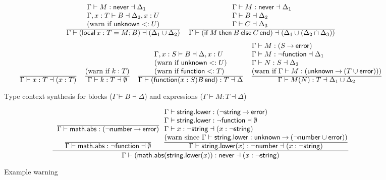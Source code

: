 \documentclass[sigplan]{acmart}
\makeatletter
\newcommand{\infer}[2]{\frac{\displaystyle\begin{array}{@{}l@{}}#1\end{array}}{\displaystyle#2}}
\newcommand{\LOCAL}{\mathop{\mathsf{local}}}
\newcommand{\FUNCTION}{\mathop{\mathsf{function}}}
\newcommand{\IF}{\mathop{\mathsf{if}}}
\newcommand{\THEN}{\mathbin{\mathsf{then}}}
\newcommand{\ELSE}{\mathbin{\mathsf{else}}}
\newcommand{\END}{\mathop{\mathsf{end}}}
\newcommand{\NEVER}{\mathsf{never}}
\newcommand{\ERROR}{\mathsf{error}}
\newcommand{\UNKNOWN}{\mathsf{unknown}}
\newcommand{\STRING}{\mathsf{string}}
\newcommand{\NUMBER}{\mathsf{number}}
\newcommand{\MATH}{\mathsf{math}}
\newcommand{\ABS}{\mathsf{abs}}
\newcommand{\LOWER}{\mathsf{lower}}
\newcommand{\fun}{\mathbin{\rightarrow}}
\makeatother
\begin{document}
\begin{figure}
  \[\begin{array}{c}
    \infer{
      \Gamma \vdash M : \NEVER \dashv \Delta_1 \\
      \Gamma, x : T \vdash B \dashv \Delta_2, x : U \\
      \mbox{(warn if $\UNKNOWN <: U$)}
    }{
      \Gamma \vdash (\LOCAL x : T = M; B) \dashv (\Delta_1 \cup \Delta_2)
    }
    \quad
    \infer{
      \Gamma \vdash M : \NEVER \dashv \Delta_1 \\
      \Gamma \vdash B \dashv \Delta_2 \\
      \Gamma \vdash C \dashv \Delta_3 
    }{
      \Gamma \vdash (\IF M \THEN B \ELSE C \END) \dashv (\Delta_1 \cup (\Delta_2 \cap \Delta_3))
    }
  \\[\bigskipamount]
    \infer{}{
      \Gamma \vdash x : T \dashv (x : T)
    }
    \quad
    \infer{
      \mbox{(warn if $k:T$)}
    }{
      \Gamma \vdash k : T \dashv \emptyset
    }
    \quad
    \infer{
      \Gamma, x:S \vdash B \dashv \Delta, x:U \\
      \mbox{(warn if $\UNKNOWN <: U$)}\\
      \mbox{(warn if ${\FUNCTION} <: T$)}
    }{
      \Gamma \vdash (\FUNCTION (x : S) B \END) : T \dashv \Delta
    }
    \quad
    \infer{
      \Gamma \vdash M : (S \fun \ERROR) \\
      \Gamma \vdash M : \neg{\FUNCTION} \dashv \Delta_1 \\
      \Gamma \vdash N : S \dashv \Delta_2  \\
      \mbox{(warn if $\Gamma \vdash M : (\UNKNOWN \fun (T \cup \ERROR))$)}
    }{
      \Gamma \vdash M(N) : T \dashv \Delta_1 \cup \Delta_2
    }
  \end{array}\]
  \caption{Type context synthesis for blocks ($\Gamma \vdash B \dashv \Delta$) and expressions ($\Gamma \vdash M:T \dashv \Delta$)}
  \label{fig:ctxtgen}
\end{figure}

\begin{figure}
  \[
    \infer{
      \begin{array}[b]{c}
      \infer{}{\Gamma \vdash \MATH.\ABS : (\neg\NUMBER \fun \ERROR)} \\[\bigskipamount]
      \infer{}{\Gamma \vdash \MATH.\ABS : \neg{\FUNCTION} \dashv \emptyset}
      \end{array}
      \infer{
        \Gamma \vdash \STRING.\LOWER : (\neg\STRING \fun \ERROR) \\
        \Gamma \vdash \STRING.\LOWER : \neg{\FUNCTION} \dashv \emptyset \\
        \Gamma \vdash x : \neg{\STRING} \dashv (x : \neg\STRING) \\
        \mbox{(warn since $\Gamma \vdash \STRING.\LOWER : \UNKNOWN \fun (\neg\NUMBER \cup \ERROR)$)}
      }{\Gamma \vdash \STRING.\LOWER(x) : \neg{\NUMBER} \dashv (x : \neg\STRING)}
    }{\Gamma \vdash (\MATH.\ABS(\STRING.\LOWER(x)) : \NEVER \dashv (x : \neg\STRING)}
  \]
  \caption{Example warning}
  \label{fig:example}
\end{figure}
\end{document}
